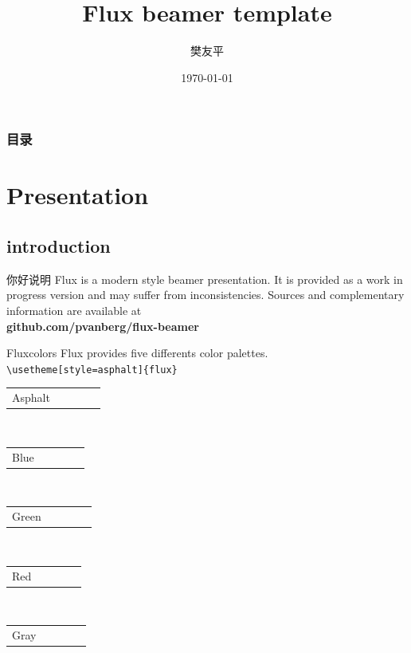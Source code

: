 \documentclass[9pt]{beamer}
\title{Flux beamer template}
\author{樊友平}
\date{\today}
\begin{document}
\hypersetup{pdfpagemode=FullScreen}
\titlepage

\begin{frame}
 \frametitle{目录}
 \tableofcontents
\end{frame}

\section{Presentation}

\subsection{introduction}

\begin{frame}{你好}{说明}
	\justifying
 Flux is a modern style beamer presentation. It is provided as a work in progress version and may suffer from inconsistencies. Sources and complementary information are available at\\[0.3cm]
 	\centering\textbf{github.com/pvanberg/flux-beamer}
\end{frame}

\def\beamer@mytheme@style{green}
\begin{frame}[fragile]{Flux}{colors}
	\centering
	Flux provides five differents color palettes.\\
	\verb+\usetheme[style=asphalt]{flux}+\\[0.8cm]
	\newcommand{\colorRow}[1]{
	\begin{tabular}{p{4cm}cccc}
	#1 & \cellcolor{primary}\hspace*{1cm} &\cellcolor{primaryLight}\hspace*{1cm}&\cellcolor{secondary}\hspace*{1cm}&\cellcolor{tertiary}\hspace*{1cm}\\
 	\end{tabular}
 	}
 	\colorRow{Asphalt}\\[0.3cm]
 	\colorRow{Blue}\\[0.3cm]
 	\colorRow{Green}\\[0.3cm]
 	\colorRow{Red}\\[0.3cm]
 	\colorRow{Gray}\\[0.3cm]
\end{frame}
\end{document}
